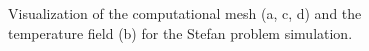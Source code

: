 \begin{figure}[ht!]
\begin{center}
\caption{Visualization of the computational mesh (a, c, d) and the temperature field (b) for the Stefan problem simulation.} \label{fig:stefan_grid}
\end{center}
\end{figure}


